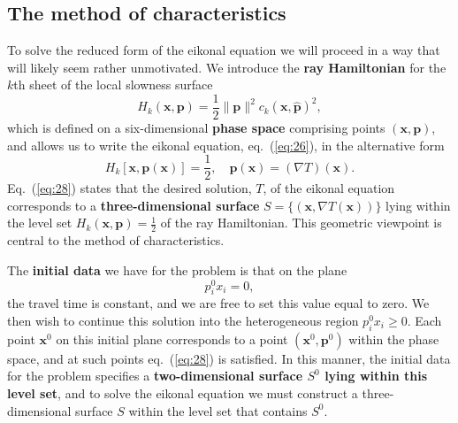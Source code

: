 \subsection*{The method of characteristics}
To solve the reduced form of the eikonal equation we will proceed in a way that will likely seem rather unmotivated. We 
introduce the \textbf{ray Hamiltonian} for the $k$th sheet of the local slowness surface
\begin{equation}
H_{k}(\mathbf{x},\mathbf{p})=\frac{1}{2}\|\mathbf{p}\|^{2}c_{k}(\mathbf{x},\hat{\mathbf{p}})^{2},
\label{eq:27}
\end{equation}
which is defined on a six-dimensional \textbf{phase space} comprising points $(\mathbf{x}, \mathbf{p})$, and allows us 
to write the eikonal equation, eq.~(\ref{eq:26}), in the alternative form
\begin{equation}
H_{k}[\mathbf{x},\mathbf{p}(\mathbf{x})]=\frac{1}{2}, \quad \mathbf{p}(\mathbf{x})=(\nabla T)(\mathbf{x}).
\label{eq:28}
\end{equation}
Eq.~(\ref{eq:28}) states that the desired solution, $T$, of the eikonal equation corresponds to a \textbf{three-dimensional surface} $S=\{(\mathbf{x},\nabla T(\mathbf{x}))\}$ lying within 
 the level set $H_{k}(\mathbf{x},\mathbf{p})=\frac{1}{2}$ of the ray Hamiltonian. This 
geometric viewpoint is central to the method of characteristics. 

The \textbf{initial data} we have for the problem is that on the plane
\begin{equation}
p_{i}^{0}x_{i}=0, 
\label{eq:29}
\end{equation}
the travel time is constant, and we are free to set this value equal to zero. We then wish to continue this solution into 
the heterogeneous region $p_{i}^{0}x_{i}\ge0$. 
Each point $\mathbf{x}^{0}$ on this initial plane corresponds to a point $(\mathbf{x}^{0},\mathbf{p}^{0})$ within the phase space, 
and at such points eq.~(\ref{eq:28}) is satisfied.
In this manner, the initial data for the problem specifies a \textbf{two-dimensional surface $S^{0}$ lying within this level set}, and to 
solve the eikonal equation we must construct
 a three-dimensional surface $S$ within the level set that contains $S^{0}$.

